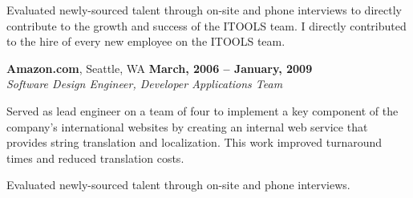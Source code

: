 \documentclass[margin,line]{resume}
\begin{document}
\begin{resume}
\begin{list2}
		Evaluated newly-sourced talent through on-site and phone interviews to
		directly contribute to the growth and success of the ITOOLS team.  I
		directly contributed to the hire of every new employee on the ITOOLS
		team.
	\end{list2}
	{\bf Amazon.com}, Seattle, WA   \hfill {\bf March, 2006 -- January, 2009}
	\vspace{1mm} \\ \vspace{1mm}
	{\sl Software Design Engineer, Developer Applications Team} %
	\begin{list2}
		\vspace*{1mm}
	\item
		Served as lead engineer on a team of four to implement a key component
		of the company's international websites by creating an internal web
		service that provides string translation and localization.  This work
		improved turnaround times and reduced translation costs.
	\item
		Evaluated newly-sourced talent through on-site and phone interviews.
	\end{list2}


\end{resume}
\end{document}

